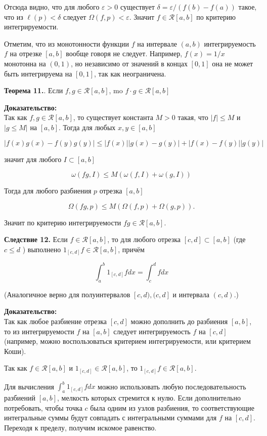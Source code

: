 \documentclass[a4paper,12pt]{article} %
\begin{document}
	Отсюда видно, что для любого $\varepsilon>0$ существует $\delta=\varepsilon /(f(b)-f(a))$ такое, что из $\ell(p)<\delta$ следует $\Omega(f, p)<\varepsilon$. Значит $f \in \mathcal{R}[a, b]$ по критерию интегрируемости.
	
	Отметим, что из монотонности функции $f$ на интервале $(a, b)$ интегрируемость $f$ на отрезке $[a, b]$ вообще говоря не следует. Например, $f(x)=1 / x$ монотонна на $(0,1)$, но независимо от значений в концах $[0,1]$ она не может быть интегрируема на $[0,1]$, так как неограничена.
	
	\textbf{Теорема 11.}. Если $f, g \in \mathcal{R}[a, b]$, mo $f \cdot g \in \mathcal{R}[a, b]$
	
	\textbf{Доказательство:\\}
	Так как $f, g \in \mathcal{R}[a, b]$, то существует константа $M>0$ такая, что $|f| \leq M$ и $|g \leq M|$ на $[a, b]$. Тогда для любых $x, y \in[a, b]$
	
	$$
	|f(x) g(x)-f(y) g(y)| \leq|f(x)||g(x)-g(y)|+|f(x)-f(y)||g(y)|
	$$
	
	значит для любого $I \subset[a, b]$
	
	$$
	\omega(f g, I) \leq M(\omega(f, I)+\omega(g, I))
	$$
	
	Тогда для любого разбиения $p$ отрезка $[a, b]$
	
	$$
	\Omega(f g, p) \leq M(\Omega(f, p)+\Omega(g, p)) .
	$$
	
	Значит по критерию интегрируемости $f g \in \mathcal{R}[a, b]$.
	
	\textbf{Следствие 12.} Если $f \in \mathcal{R}[a, b]$, то для любого отрезка $[c, d] \subset[a, b]$ (где $c \leq d$ ) выполнено $1_{[c, d]} f \in \mathcal{R}[a, b]$, причём
	
	$$
	\int_{a}^{b} 1_{[c, d]} f d x=\int_{c}^{d} f d x
	$$
	
	(Аналогичное верно для полуинтервалов $[c, d),(c, d]$ и интервала $(c, d)$.)
	
	\textbf{Доказательство:\\}
	Так как любое разбиение отрезка $[c, d]$ можно дополнить до разбиения $[a, b]$, то из интегрируемости $f$ на $[a, b]$ следует интегрируемость $f$ на $[c, d]$ (например, можно воспользоваться критерием интегрируемости, или критерием Коши).
	
	Так как $f \in \mathcal{R}[a, b]$ и $1_{[c, d]} \in \mathcal{R}[a, b]$, то $1_{[c, d]} f \in \mathcal{R}[a, b]$.
	
	Для вычисления $\int_{a}^{b} 1_{[c, d]} f d x$ можно использовать любую последовательность разбиений $[a, b]$, мелкость которых стремится к нулю. Если дополнительно потребовать, чтобы точка $c$ была одним из узлов разбиения, то соответствующие интегральные суммы будут совпадать с интегральными суммами для $f$ на $[c, d]$. Переходя к пределу, получим искомое равенство.
	
\end{document}
